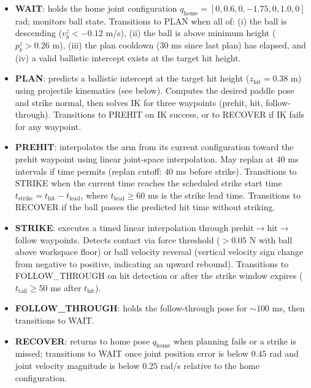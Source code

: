\documentclass[10pt,twocolumn,letterpaper]{article}
\begin{document}
\begin{itemize}[leftmargin=*,noitemsep]
    \item \textbf{WAIT}: holds the home joint configuration $q_{\mathrm{home}} = [0, 0.6, 0, -1.75, 0, 1.0, 0]$ rad; monitors ball state. Transitions to PLAN when all of: (i) the ball is descending ($v_b^z < -0.12$ m/s), (ii) the ball is above minimum height ($p_b^z > 0.26$ m), (iii) the plan cooldown ($30$ ms since last plan) has elapsed, and (iv) a valid ballistic intercept exists at the target hit height.

    \item \textbf{PLAN}: predicts a ballistic intercept at the target hit height ($z_{\mathrm{hit}} = 0.38$ m) using projectile kinematics (see below). Computes the desired paddle pose and strike normal, then solves IK for three waypoints (prehit, hit, follow-through). Transitions to PREHIT on IK success, or to RECOVER if IK fails for any waypoint.

    \item \textbf{PREHIT}: interpolates the arm from its current configuration toward the prehit waypoint using linear joint-space interpolation. May replan at $40$ ms intervals if time permits (replan cutoff: $40$ ms before strike). Transitions to STRIKE when the current time reaches the scheduled strike start time $t_{\mathrm{strike}} = t_{\mathrm{hit}} - t_{\mathrm{lead}}$, where $t_{\mathrm{lead}} \ge 60$ ms is the strike lead time. Transitions to RECOVER if the ball passes the predicted hit time without striking.

    \item \textbf{STRIKE}: executes a timed linear interpolation through prehit$\to$hit$\to$follow waypoints. Detects contact via force threshold ($> 0.05$ N with ball above workspace floor) or ball velocity reversal (vertical velocity sign change from negative to positive, indicating an upward rebound). Transitions to FOLLOW\_THROUGH on hit detection or after the strike window expires ($t_{\mathrm{tail}} \ge 50$ ms after $t_{\mathrm{hit}}$).

    \item \textbf{FOLLOW\_THROUGH}: holds the follow-through pose for $\sim\!100$ ms, then transitions to WAIT.

    \item \textbf{RECOVER}: returns to home pose $q_{\mathrm{home}}$ when planning fails or a strike is missed; transitions to WAIT once joint position error is below $0.45$ rad and joint velocity magnitude is below $0.25$ rad/s relative to the home configuration.
\end{itemize}
\end{document}
